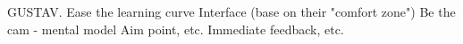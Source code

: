 
GUSTAV. Ease the learning curve
Interface (base on their "comfort zone")
Be the cam - mental model
Aim point, etc.
Immediate feedback, etc.